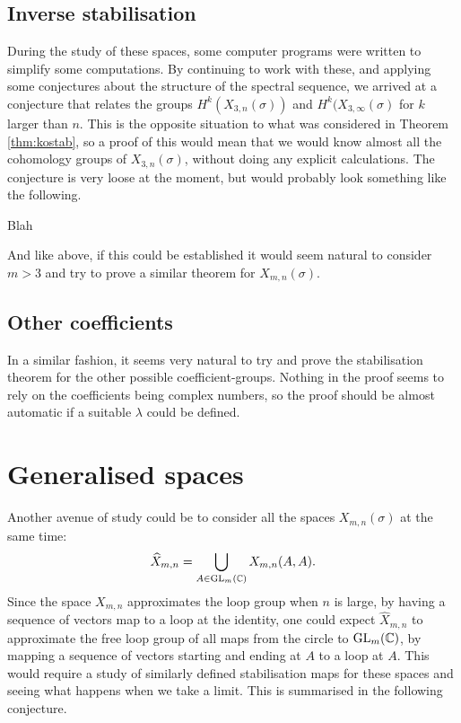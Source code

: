 \subsection{Inverse stabilisation}

During the study of these spaces, some computer programs were written
to simplify some computations. By continuing to work with these, and
applying some conjectures about the structure of the spectral
sequence, we arrived at a conjecture that relates the groups
$H^k(X_{3,n}(\sigma))$ and $H^k(X_{3,\infty}(\sigma)$ for $k$ larger
than $n$. This is the opposite situation to what was considered in
Theorem \ref{thm:kostab}, so a proof of this would mean that we
would know almost all the cohomology groups of $X_{3,n}(\sigma)$,
without doing any explicit calculations. The conjecture is very loose
at the moment, but would probably look something like the following.
\begin{conjecture}
  Blah 
\end{conjecture}

And like above, if this could be established it would seem natural to
consider $m > 3$ and try to prove a similar theorem for
$X_{m,n}(\sigma)$.

\subsection{Other coefficients}

In a similar fashion, it seems very natural to try and prove the
stabilisation theorem for the other possible
coefficient-groups. Nothing in the proof seems to rely on the
coefficients being complex numbers, so the proof should be almost
automatic if a suitable $\lambda$ could be defined.

\section{Generalised spaces}

Another avenue of study could be to consider all the spaces
$X_{m,n}(\sigma)$ at the same time:
\[ \widehat{X}_{m,n} = \bigcup_{A \in \operatorname{GL}_m(\mathbb{C})} X_{m,n}(A,A). \]
Since the space $X_{m,n}$ approximates the loop group when $n$ is
large, by having a sequence of vectors map to a loop at the identity,
one could expect $\widehat{X}_{m,n}$ to approximate the free loop
group of all maps from the circle to $\operatorname{GL}_m(\mathbb{C})$, by mapping a
sequence of vectors starting and ending at $A$ to a loop at $A$. This
would require a study of similarly defined stabilisation maps for
these spaces and seeing what happens when we take a limit. This
is summarised in the following conjecture.

